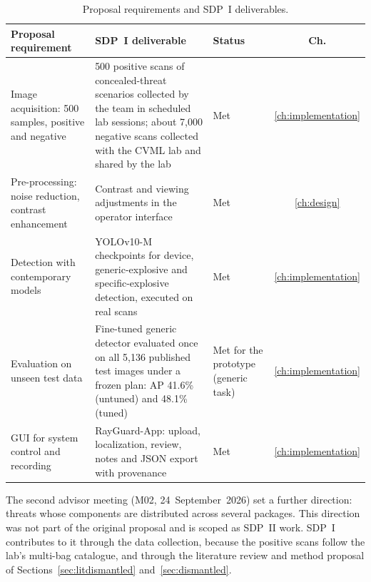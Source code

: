 \begin{table}[htbp]
\centering\tablesetup
\caption{Proposal requirements and SDP~I deliverables.}
\label{tab:objectives}
\begin{tabularx}{\textwidth}{@{}L{0.2\textwidth}YL{0.2\textwidth}c@{}}
\toprule
Proposal requirement & SDP~I deliverable & Status & Ch.\\
\midrule
Image acquisition: 500 samples, positive and negative & 500 positive scans of
concealed-threat scenarios collected by the team in scheduled lab sessions;
about 7,000 negative scans collected with the CVML lab and shared by the lab &
Met & \ref{ch:implementation}\\
Pre-processing: noise reduction, contrast enhancement & Contrast and viewing
adjustments in the operator interface & Met & \ref{ch:design}\\
Detection with contemporary models & YOLOv10-M checkpoints for device,
generic-explosive and specific-explosive detection, executed on real scans &
Met & \ref{ch:implementation}\\
Evaluation on unseen test data & Fine-tuned generic detector evaluated once on all
5,136 published test images under a frozen plan: AP 41.6\% (untuned) and 48.1\%
(tuned) & Met for the prototype (generic task) &
\ref{ch:implementation}\\
GUI for system control and recording & RayGuard-App: upload, localization,
review, notes and JSON export with provenance & Met & \ref{ch:implementation}\\
\bottomrule
\end{tabularx}
\end{table}

The second advisor meeting (M02, 24~September~2026) set a further direction:
threats whose components are distributed across several packages. This
direction was not part of the original proposal and is scoped as SDP~II work.
SDP~I contributes to it through the data collection, because the positive scans
follow the lab's multi-bag catalogue, and through the literature review and method
proposal of Sections~\ref{sec:litdismantled} and~\ref{sec:dismantled}.

